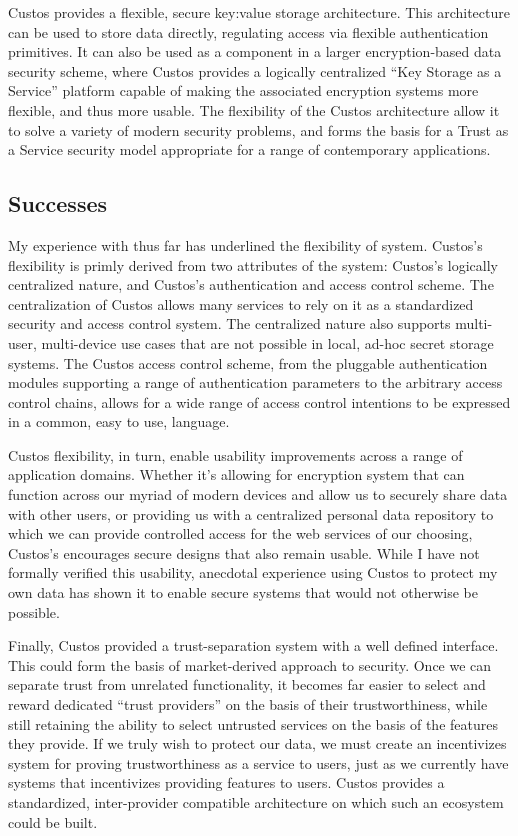 Custos provides a flexible, secure key:value storage
architecture. This architecture can be used to store data directly,
regulating access via flexible authentication primitives. It can also
be used as a component in a larger encryption-based data security
scheme, where Custos provides a logically centralized ``Key Storage as
a Service'' platform capable of making the associated encryption
systems more flexible, and thus more usable. The flexibility of the
Custos architecture allow it to solve a variety of modern security
problems, and forms the basis for a Trust as a Service security model
appropriate for a range of contemporary applications.

\subsection{Successes}

My experience with thus far has underlined the flexibility of
system. Custos's flexibility is primly derived from two attributes of
the system: Custos's logically centralized nature, and Custos's
authentication and access control scheme. The centralization of Custos
allows many services to rely on it as a standardized security and
access control system. The centralized nature also supports
multi-user, multi-device use cases that are not possible in local,
ad-hoc secret storage systems. The Custos access control scheme, from
the pluggable authentication modules supporting a range of
authentication parameters to the arbitrary access control chains,
allows for a wide range of access control intentions to be expressed
in a common, easy to use, language.

Custos flexibility, in turn, enable usability improvements across a
range of application domains. Whether it's allowing for encryption
system that can function across our myriad of modern devices and allow
us to securely share data with other users, or providing us with a
centralized personal data repository to which we can provide
controlled access for the web services of our choosing, Custos's
encourages secure designs that also remain usable. While I have not
formally verified this usability, anecdotal experience using Custos to
protect my own data has shown it to enable secure systems that would
not otherwise be possible.

Finally, Custos provided a trust-separation system with a well defined
interface. This could form the basis of market-derived approach to
security. Once we can separate trust from unrelated functionality, it
becomes far easier to select and reward dedicated ``trust providers''
on the basis of their trustworthiness, while still retaining the
ability to select untrusted services on the basis of the features they
provide. If we truly wish to protect our data, we must create an
incentivizes system for proving trustworthiness as a service to users,
just as we currently have systems that incentivizes providing features
to users. Custos provides a standardized, inter-provider compatible
architecture on which such an ecosystem could be built.


